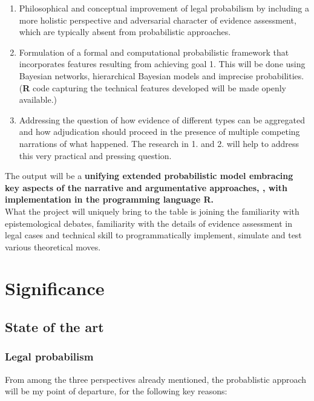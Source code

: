 \documentclass[11pt,dvipsnames,enabledeprecatedfontcommands]{scrartcl}
\begin{document}
\begin{enumerate}
\def\labelenumi{\arabic{enumi}.}
\item
  Philosophical and conceptual improvement of legal probabilism by
  including a more holistic perspective and adversarial character of
  evidence assessment, which are typically absent from probabilistic
  approaches.
\item
  Formulation of a formal and computational probabilistic framework that
  incorporates features resulting from achieving goal 1. This will be
  done using Bayesian networks, hierarchical Bayesian models and
  imprecise probabilities. (\textbf{\textsf{R}} code capturing the
  technical features developed will be made openly available.)
\item
  Addressing the question of how evidence of different types can be
  aggregated and how adjudication should proceed in the presence of
  multiple competing narrations of what happened. The research in 1. and
  2. will help to address this very practical and pressing question.
\end{enumerate}

The output will be a
\textbf{unifying extended probabilistic model embracing key aspects of the narrative and argumentative approaches, , with  implementation in the programming language \textbf{\textsf{R}}.}\\
What the project will uniquely bring to the table is joining the
familiarity with epistemological debates, familiarity with the details
of evidence assessment in legal cases and technical skill to
programmatically implement, simulate and test various theoretical moves.

\pagebreak 

\section{Significance}\label{significance}

\subsection{State of the art}\label{state-of-the-art}

\subsubsection{Legal probabilism}\label{legal-probabilism}

From among the three perspectives already mentioned, the probablistic
approach will be my point of departure, for the following key reasons:
\end{document}
